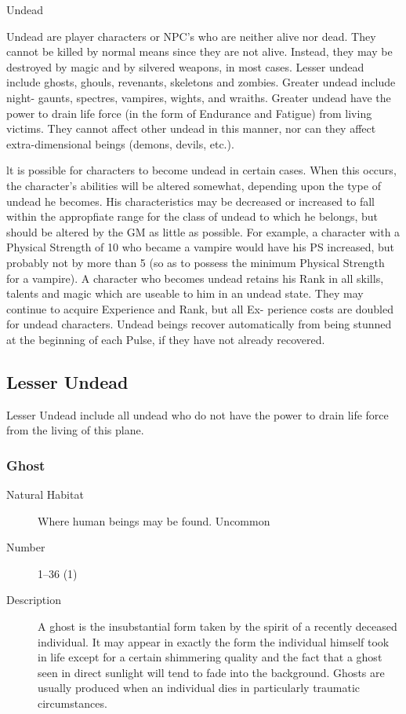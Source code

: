 \begin{mmgroup}{Undead}

Undead are player characters or NPC's who are neither alive nor
dead. They cannot be killed by normal means since they are not
alive. Instead, they may be destroyed by magic and by silvered
weapons, in most cases.  Lesser undead include ghosts, ghouls,
revenants, skeletons and zombies.  Greater undead include night-
gaunts, spectres, vampires, wights, and wraiths.  Greater undead have
the power to drain life force (in the form of Endurance and Fatigue)
from living victims.  They cannot affect other undead in this manner,
nor can they affect extra-dimensional beings (demons, devils, etc.).

lt is possible for characters to become undead in certain cases.  When
this occurs, the character's abilities will be altered somewhat,
depending upon the type of undead he becomes.  His characteristics may
be decreased or increased to fall within the appropfiate range for the
class of undead to which he belongs, but should be altered by the GM
as little as possible.  For example, a character with a Physical
Strength of 10 who became a vampire would have his PS increased, but
probably not by more than 5 (so as to possess the minimum Physical
Strength for a vampire).  A character who becomes undead retains his
Rank in all skills, talents and magic which are useable to him in an
undead state.  They may continue to acquire Experience and Rank, but
all Ex- perience costs are doubled for undead characters.  Undead
beings recover automatically from being stunned at the beginning of
each Pulse, if they have not already recovered.
\subsection{Lesser Undead}
Lesser Undead include all undead who do not have the power to drain
life force from the living of this plane.

\subsubsection{Ghost}

\begin{description}
\item[Natural Habitat] Where human beings may be found. Uncommon

\item[Number] 1–36 (1)

\item[Description] A ghost is the insubstantial form taken by the spirit of
a recently deceased individual. It may appear in exactly the form the
individual himself took in life except for a certain shimmering
quality and the fact that a ghost seen in direct sunlight will tend to
fade into the background. Ghosts are usually produced when an
individual dies in particularly traumatic circumstances.


\end{description}
\end{mmgroup}
